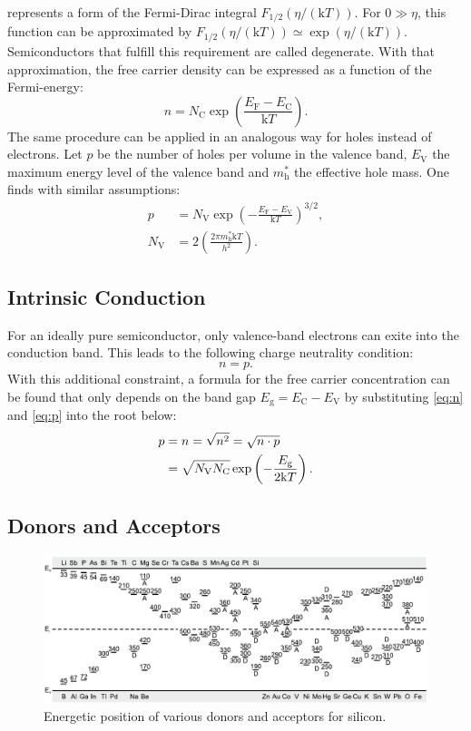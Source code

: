  represents a form of the Fermi-Dirac integral
$F_{1 /2}(\eta  / (\mathrm{k}T))$.
For $0 \gg \eta$,
this function can be approximated by $F_{1 /2}(\eta  / (\mathrm{k}T))
	\simeq \exp(\eta /(\mathrm{k}T))$.
Semiconductors that fulfill this requirement are called degenerate.
With that approximation, the free carrier density can be expressed as
a function of the Fermi-energy:
\begin{equation}
	n	= { N_{\mathrm{C}} }\exp\left( \frac{E_{\mathrm{F}}
		-E_{\mathrm{C}}}{\mathrm{k}T} \right).
	\label{eq:n}
\end{equation}
The same procedure can be applied in an analogous way for holes instead of
electrons.
Let $p$ be the number of holes per volume in the valence band, $E_\mathrm{V}$ 
the maximum energy level of the valence band and $m^*_\mathrm{h}$ the
effective hole mass. One finds with similar assumptions:
\begin{align}
	p            & = N_\mathrm{V} \exp
	\left( - \frac{E_{\mathrm{F}}-E_{\mathrm{V}}}{\mathrm{k}T} \right)^{3 / 2}
	\label{eq:p},                                        \\
	N_\mathrm{V} & = 2 \left( \frac{2 \pi m^*_\mathrm{h}
		\mathrm{k}T}{h^2} \right).
\end{align}

\subsection{Intrinsic Conduction}
For an ideally pure semiconductor, only valence-band electrons
can exite into the conduction band.
This leads to the following charge neutrality condition:
\begin{equation}
	n = p.
\end{equation}
With this additional constraint, a formula for the free
carrier concentration can be found that only depends on the
band gap $E_\mathrm{g} = E_\mathrm{C} - E_\mathrm{V}$ by
substituting \cref{eq:n} and \cref{eq:p}
into the root below:
\begin{align}
	p & = n = \sqrt{n^2} = \sqrt{n \cdot p} \notag \\
	  & =\sqrt{ N_{\mathrm{V}}N_{\mathrm{C}} }
	\exp\left( -\frac{E_{\mathrm{g}}}{2\mathrm{k}T} \right).
\end{align}

\subsection{Donors and Acceptors}
\begin{figure}
	\centering
	\includegraphics[width=0.6\linewidth]{../assets/energy_level.png}
	\caption{Energetic position of various donors and acceptors
		for silicon. }
	\label{fig:energy_level}
\end{figure}

